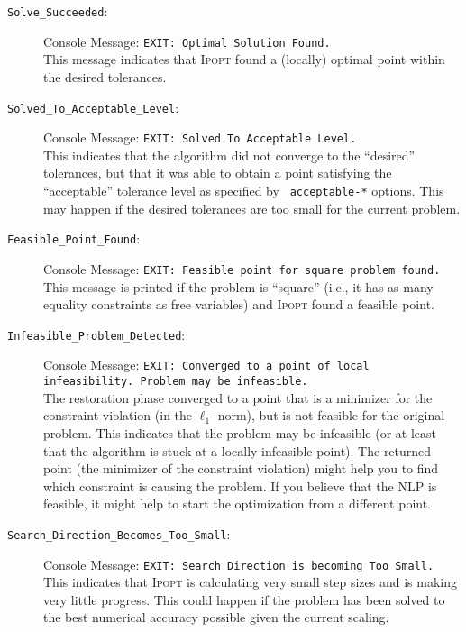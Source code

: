 \documentclass[10pt]{article}
\newcommand{\Ipopt}{\textsc{Ipopt}\xspace}
\begin{document}
\begin{description}
\item[{\tt Solve\_Succeeded}:] $\;$ \\
  Console Message: {\tt EXIT: Optimal Solution Found.} \\
  This message indicates that \Ipopt found a (locally) optimal point
  within the desired tolerances.
\item[{\tt Solved\_To\_Acceptable\_Level}:]  $\;$ \\
  Console Message: {\tt EXIT: Solved To Acceptable Level.} \\
  This indicates that the algorithm did not converge to the
  ``desired'' tolerances, but that it was able to obtain a point
  satisfying the ``acceptable'' tolerance level as specified by {\tt
    acceptable-*} options. This may happen if the desired tolerances
  are too small for the current problem.
\item[{\tt Feasible\_Point\_Found}:]  $\;$ \\
  Console Message: {\tt EXIT: Feasible point for square problem found.} \\
  This message is printed if the problem is ``square'' (i.e., it has
  as many equality constraints as free variables) and \Ipopt found a
  feasible point.
\item[{\tt Infeasible\_Problem\_Detected}:]  $\;$ \\
  Console Message: {\tt EXIT: Converged to a point of
    local infeasibility. Problem may be infeasible.} \\
  The restoration phase converged to a point that is a minimizer for
  the constraint violation (in the $\ell_1$-norm), but is not feasible
  for the original problem. This indicates that the problem may be
  infeasible (or at least that the algorithm is stuck at a locally
  infeasible point).  The returned point (the minimizer of the
  constraint violation) might help you to find which constraint is
  causing the problem.  If you believe that the NLP is feasible,
  it might help to start the optimization from a different point.
\item[{\tt Search\_Direction\_Becomes\_Too\_Small}:]  $\;$ \\
  Console Message: {\tt EXIT: Search Direction is becoming Too Small.} \\
  This indicates that \Ipopt is calculating very small step sizes and
  is making very little progress.  This could happen if the problem has
  been solved to the best numerical accuracy possible given the
  current scaling.

\end{description}
\end{document}
